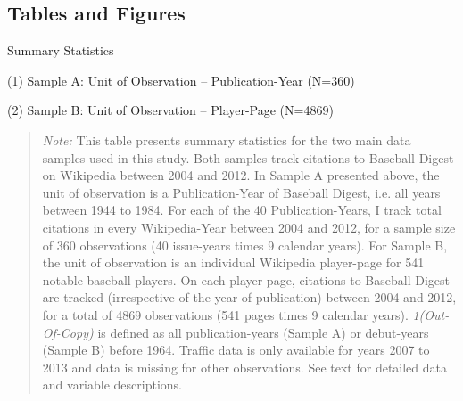 
\newpage



\begin{center}
\begin{table}[!htbp]
\section{Tables and Figures}
\caption{Summary Statistics}
\vspace{2.5mm}
\caption*{(1) Sample A: Unit of Observation -- Publication-Year (N=360)}
\vspace{2.5mm}

\vspace{2.5mm}
\caption*{(2) Sample B: Unit of Observation -- Player-Page (N=4869)}
\vspace{2.5mm}

\vspace{5mm}
\label{tab:summary}

\begin{adjustwidth}{-2cm}{-2cm}
\begin{quote}
\emph{Note:} This table presents summary statistics for the two main data samples used in this study. Both samples track citations to Baseball Digest on Wikipedia between 2004 and 2012. In Sample A presented above, the unit of observation is a Publication-Year of Baseball Digest, i.e. all years between 1944 to 1984. For each of the 40 Publication-Years, I track total citations in every Wikipedia-Year between 2004 and 2012, for a sample size of 360 observations (40 issue-years times 9 calendar years). For Sample B, the unit of observation is an individual Wikipedia player-page for 541 notable baseball players. On each player-page, citations to Baseball Digest are tracked (irrespective of the year of publication) between 2004 and 2012, for a total of 4869 observations (541 pages times 9 calendar years). \emph{1(Out-Of-Copy)} is defined as all publication-years (Sample A) or debut-years (Sample B) before 1964. Traffic data is only available for years 2007 to 2013 and data is missing for other observations. See text for detailed data and variable descriptions.
\end{quote}
\end{adjustwidth}

\end{table}
\end{center}

